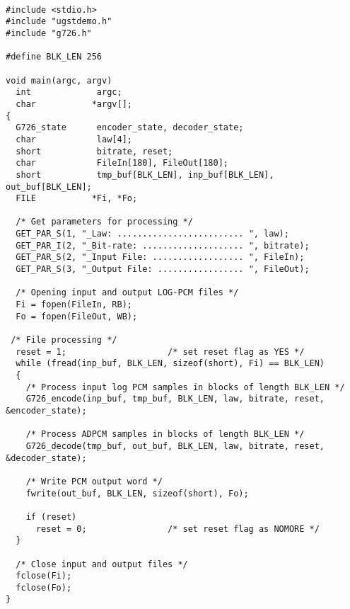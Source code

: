 {\tt\small
\begin{verbatim}
#include <stdio.h>
#include "ugstdemo.h"
#include "g726.h"

#define BLK_LEN 256

void main(argc, argv)
  int             argc;
  char           *argv[];
{
  G726_state      encoder_state, decoder_state;
  char            law[4];
  short           bitrate, reset;
  char            FileIn[180], FileOut[180];
  short           tmp_buf[BLK_LEN], inp_buf[BLK_LEN], out_buf[BLK_LEN];
  FILE           *Fi, *Fo;

  /* Get parameters for processing */
  GET_PAR_S(1, "_Law: ......................... ", law);
  GET_PAR_I(2, "_Bit-rate: .................... ", bitrate);
  GET_PAR_S(2, "_Input File: .................. ", FileIn);
  GET_PAR_S(3, "_Output File: ................. ", FileOut);

  /* Opening input and output LOG-PCM files */
  Fi = fopen(FileIn, RB);
  Fo = fopen(FileOut, WB);

 /* File processing */
  reset = 1;                    /* set reset flag as YES */
  while (fread(inp_buf, BLK_LEN, sizeof(short), Fi) == BLK_LEN)
  {
    /* Process input log PCM samples in blocks of length BLK_LEN */
    G726_encode(inp_buf, tmp_buf, BLK_LEN, law, bitrate, reset, &encoder_state);

    /* Process ADPCM samples in blocks of length BLK_LEN */
    G726_decode(tmp_buf, out_buf, BLK_LEN, law, bitrate, reset, &decoder_state);

    /* Write PCM output word */
    fwrite(out_buf, BLK_LEN, sizeof(short), Fo);

    if (reset)
      reset = 0;                /* set reset flag as NOMORE */
  }

  /* Close input and output files */
  fclose(Fi);
  fclose(Fo);
}
\end{verbatim}
}
